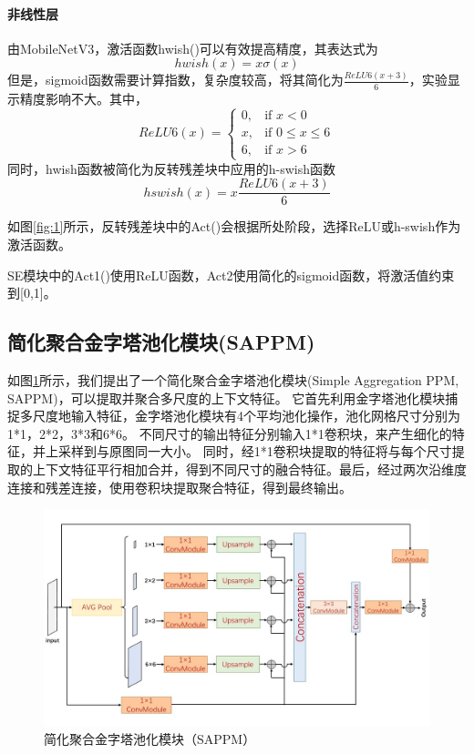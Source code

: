 \documentclass[11pt]{article}
\begin{document}
\paragraph{非线性层}
由MobileNetV3，激活函数hwish()可以有效提高精度，其表达式为
\[hwish(x)=x\sigma(x)\]
但是，sigmoid函数需要计算指数，复杂度较高，\cite{ref12}将其简化为$\frac{ReLU6(x+3)}6$，实验显示精度影响不大。其中，
\[ReLU6(x) = 
\begin{cases}
    0, & \text{if } x < 0 \\
    x, & \text{if } 0 \leq x \leq 6 \\
    6, & \text{if } x  >6
\end{cases}\]
同时，hwish函数被简化为反转残差块中应用的h-swish函数
\[hswish(x)=x\frac{ReLU6(x+3)}6\]

如图\ref{fig:1}所示，反转残差块中的Act()会根据所处阶段，选择ReLU或h-swish作为激活函数。

SE模块中的Act1()使用ReLU函数，Act2使用简化的sigmoid函数，将激活值约束到[0,1]。

\subsection{简化聚合金字塔池化模块(SAPPM)}
如图\ref{fig:2}所示，我们提出了一个简化聚合金字塔池化模块(Simple Aggregation PPM, SAPPM)，可以提取并聚合多尺度的上下文特征。
它首先利用金字塔池化模块捕捉多尺度地输入特征，金字塔池化模块有4个平均池化操作，池化网格尺寸分别为1*1，2*2，3*3和6*6。
不同尺寸的输出特征分别输入1*1卷积块，来产生细化的特征，并上采样到与原图同一大小。
同时，经1*1卷积块提取的特征将与每个尺寸提取的上下文特征平行相加合并，得到不同尺寸的融合特征。最后，经过两次沿维度连接和残差连接，使用卷积块提取聚合特征，得到最终输出。
\begin{figure}[!h]
  \centering
  \includegraphics[width=12cm]{sappm.png}

  \centering
  \caption{简化聚合金字塔池化模块（SAPPM）}
  \label{fig:2}
\end{figure}
\end{document}
